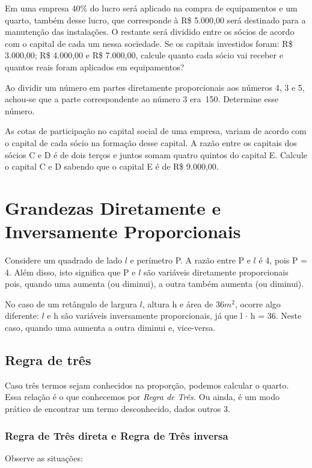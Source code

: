 \begin{exercicios}
	\exitem{} Em uma empresa 40\% do lucro será aplicado na compra de equipamentos e um quarto, também desse lucro, que corresponde à R\$ 5.000,00 será destinado para a manutenção das instalações. O restante será dividido entre os sócios de acordo com o capital de cada um nessa sociedade. Se os capitais investidos foram: R\$  3.000,00; R\$  4.000,00 e R\$  7.000,00, calcule quanto cada sócio vai receber e quantos reais foram aplicados em equipamentos? 

	\exitem{} Ao dividir um número em partes diretamente proporcionais aos números 4, 3 e 5, achou-se que a parte correspondente ao número 3 era\ 150. Determine esse número.  

	\exitem{} As cotas de participação no capital social de uma empresa, variam de acordo com o capital de cada sócio na formação desse capital. A razão entre os capitais dos sócios C e D é de dois terços e juntos somam quatro quintos do capital E. Calcule o capital C e D sabendo que o capital E é de R\$  9.000,00. 

\end{exercicios}

\section{Grandezas Diretamente e Inversamente Proporcionais}

Considere um quadrado de lado $l$ e perímetro P. A razão entre P e $l$ é 4, pois P = 4. Além disso, isto significa que P e $l$ são variáveis diretamente proporcionais pois, quando uma aumenta (ou diminui), a outra também aumenta (ou diminui).

No caso de um retângulo de largura $l$, altura h e área de 36$m^2$, ocorre algo diferente:  $l$ e h são variáveis inversamente proporcionais, já que l $ \cdot $  h = 36. Neste caso, quando uma aumenta a outra diminui e, vice-versa.

\subsection{Regra de três}

\quad Caso três termos sejam conhecidos na proporção, podemos calcular o quarto. Essa relação é o que conhecemos por \textit{Regra de Três. }Ou ainda, é um modo prático de encontrar um termo desconhecido, dados outros 3. 

\subsubsection{Regra de Três direta e Regra de Três inversa}
\quad Observe as situações:

